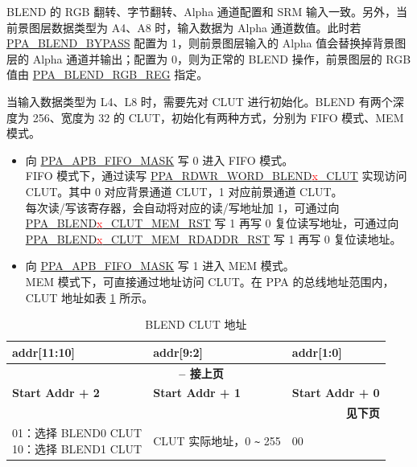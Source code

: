 \documentclass[main\_\_CN.tex]{subfiles}
\begin{document}
BLEND 的 RGB 翻转、字节翻转、Alpha 通道配置和 SRM 输入一致。另外，当前景图层数据类型为 A4、A8 时，输入数据为 Alpha 通道数值。此时若 \hyperref[fielddesc:PPABLENDBYPASS]{PPA\_BLEND\_BYPASS} 配置为 1，则前景图层输入的 Alpha 值会替换掉背景图层的 Alpha 通道并输出；配置为 0，则为正常的 BLEND 操作，前景图层的 RGB 值由 \hyperref[regdesc:PPABLENDRGBREG]{PPA\_BLEND\_RGB\_REG} 指定。

当输入数据类型为 L4、L8 时，需要先对 CLUT 进行初始化。BLEND 有两个深度为 256、宽度为 32 的 CLUT，初始化有两种方式，分别为 FIFO 模式、MEM 模式。

\begin{itemize}
    \item 向 \hyperref[fielddesc:PPAAPBFIFOMASK]{PPA\_APB\_FIFO\_MASK} 写 0 进入 FIFO 模式。\\
    FIFO 模式下，通过读写 \hyperref[fielddesc:PPARDWRWORDBLEND0CLUT]{PPA\_RDWR\_WORD\_BLEND\textcolor{red}{x}\_CLUT} 实现访问 CLUT。其中 0 对应背景通道 CLUT，1 对应前景通道 CLUT。\\
    每次读/写该寄存器，会自动将对应的读/写地址加 1，可通过向 \hyperref[fielddesc:PPABLEND0CLUTMEMRST]{PPA\_BLEND\textcolor{red}{x}\_CLUT\_MEM\_RST} 写 1 再写 0 复位读写地址，可通过向\hyperref[fielddesc:PPABLEND0CLUTMEMRDADDRRST]{PPA\_BLEND\textcolor{red}{x}\_CLUT\_MEM\_RDADDR\_RST} 写 1 再写 0 复位读地址。
    \item 向 \hyperref[fielddesc:PPAAPBFIFOMASK]{PPA\_APB\_FIFO\_MASK} 写 1 进入 MEM 模式。\\
    MEM 模式下，可直接通过地址访问 CLUT。在 PPA 的总线地址范围内，CLUT 地址如表 \ref{tab:blend-clut-addr} 所示。
\end{itemize}

\begin{longtable}[c]{ |p{5cm}|p{5cm}|p{2.5cm}| }
    \caption{BLEND CLUT 地址}
    \label{tab:blend-clut-addr}\\\hline

    \rowcolor{lightgray}
    \textbf{addr[11:10]} & \textbf{addr[9:2]} & \textbf{addr[1:0]} \\\hline
    \endfirsthead


    \multicolumn{3}{c}{\bfseries \tablename\ \thetable{} -- 接上页}\\\hline
    \rowcolor{lightgray}
    \textbf{Start Addr + 2} & \textbf{Start Addr + 1} & \textbf{Start Addr + 0} \\\hline
    \endhead

    \multicolumn{3}{r}{\textbf{见下页}} \\
    \endfoot

    \endlastfoot

        \makecell[l]{01：选择 BLEND0 CLUT\\10：选择 BLEND1 CLUT} & CLUT 实际地址，0 \verb+~+ 255 & 00 \\\hline

\end{longtable}
\end{document}
